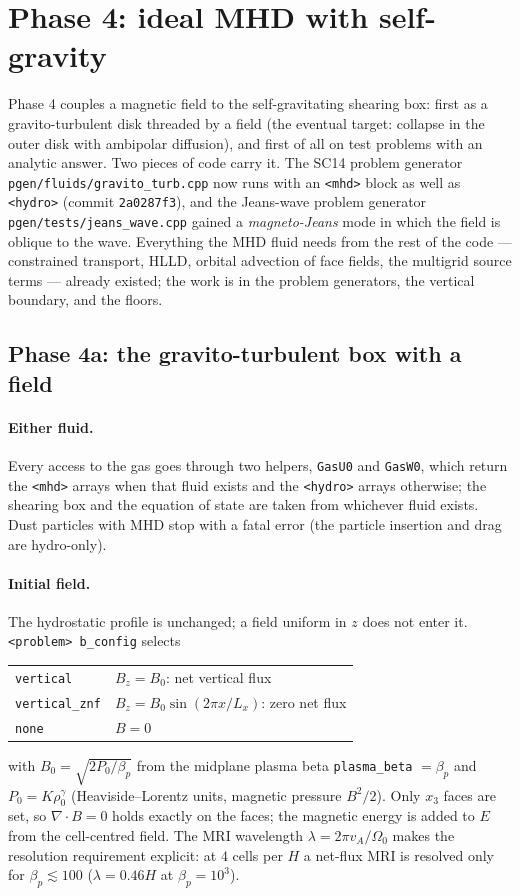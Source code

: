 \documentclass[11pt]{article}
\newcommand{\code}[1]{\texttt{#1}}
\newcommand{\file}[1]{\texttt{\small #1}}
\newcommand{\fn}[1]{\texttt{\small #1}}
\newcommand{\Om}{\Omega_0}
\begin{document}
\section{Phase 4: ideal MHD with self-gravity}
\label{sec:phase4}

Phase 4 couples a magnetic field to the self-gravitating shearing box: first as a
gravito-turbulent disk threaded by a field (the eventual target: collapse in the outer
disk with ambipolar diffusion), and first of all on test problems with an analytic answer.
Two pieces of code carry it. The SC14 problem generator \file{pgen/fluids/gravito\_turb.cpp}
now runs with an \code{<mhd>} block as well as \code{<hydro>} (commit \code{2a0287f3}), and
the Jeans-wave problem generator \file{pgen/tests/jeans\_wave.cpp} gained a
\emph{magneto-Jeans} mode in which the field is oblique to the wave. Everything the MHD
fluid needs from the rest of the code --- constrained transport, HLLD, orbital advection of
face fields, the multigrid source terms --- already existed; the work is in the problem
generators, the vertical boundary, and the floors.

\subsection{Phase 4a: the gravito-turbulent box with a field}
\label{sec:phase4a}

\paragraph{Either fluid.} Every access to the gas goes through two helpers,
\fn{GasU0} and \fn{GasW0}, which return the \code{<mhd>} arrays when that fluid exists and
the \code{<hydro>} arrays otherwise; the shearing box and the equation of state are taken
from whichever fluid exists. Dust particles with MHD stop with a fatal error (the particle
insertion and drag are hydro-only).

\paragraph{Initial field.} The hydrostatic profile is unchanged; a field uniform in $z$
does not enter it. \code{<problem> b\_config} selects
\begin{center}\begin{tabular}{ll}\toprule
\code{vertical} & $B_z = B_0$: net vertical flux \\
\code{vertical\_znf} & $B_z = B_0\sin(2\pi x/L_x)$: zero net flux \\
\code{none} & $B = 0$ \\ \bottomrule
\end{tabular}\end{center}
with $B_0 = \sqrt{2P_0/\beta_p}$ from the midplane plasma beta \code{plasma\_beta}
$=\beta_p$ and $P_0 = K\rho_0^{\gamma}$ (Heaviside--Lorentz units, magnetic pressure
$B^2/2$). Only $x_3$ faces are set, so $\nabla\!\cdot\!B = 0$ holds exactly on the faces;
the magnetic energy is added to $E$ from the cell-centred field. The MRI wavelength
$\lambda = 2\pi v_A/\Om$ makes the resolution requirement explicit: at $4$ cells per $H$ a
net-flux MRI is resolved only for $\beta_p \lesssim 100$ ($\lambda = 0.46H$ at
$\beta_p = 10^3$).
\end{document}
